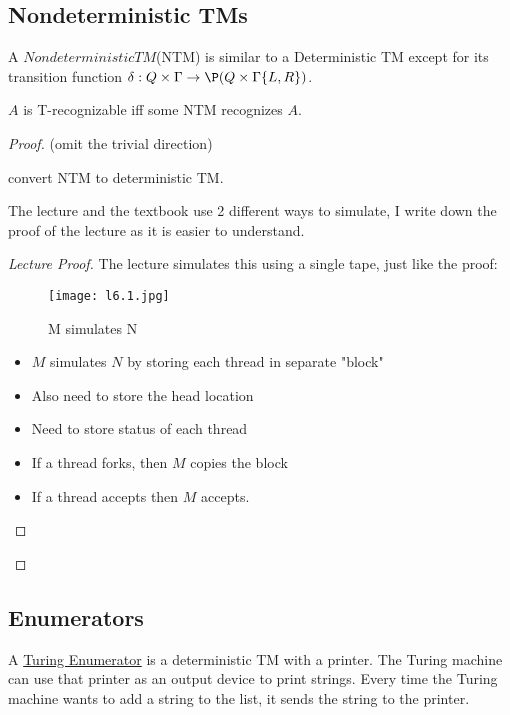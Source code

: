 \subsection{Nondeterministic TMs}

A \(Nondeterministic TM\)(NTM) is similar to a Deterministic TM except for its transition function \(\delta: Q \times \Gamma \rightarrow \P(Q \times \Gamma \{ L, R \} )\).

\begin{theorem}
    \(A\) is T-recognizable iff some NTM recognizes \(A\).  
\end{theorem}
\begin{proof}
    (omit the trivial direction)
    \begin{lemma}
        convert NTM to deterministic TM.
    \end{lemma}
    The lecture and the textbook use 2 different ways to simulate, I write down the proof of the lecture as it is easier to understand.

    \begin{proof}[Lecture Proof]
        The lecture simulates this using a single tape, just like the proof:

        \begin{figure}[H]
            \centering
            \texttt{[image: l6.1.jpg]}
            \caption{M simulates N}
        \end{figure}

        \begin{itemize}
            \item \(M\) simulates \(N\) by storing each thread in separate "block"
            \item Also need to store the head location
            \item Need to store status of each thread
            \item If a thread forks, then \(M\) copies the block
            \item If a thread accepts then \(M\) accepts.    
        \end{itemize}
    \end{proof}
\end{proof}

\subsection{Enumerators}

\begin{definition}[informal]
    A \underline{Turing Enumerator} is a deterministic TM with a printer. The Turing machine can use that printer as an output device to print strings. Every time the Turing machine wants to add a string to the list, it sends the string to the printer.
\end{definition}

